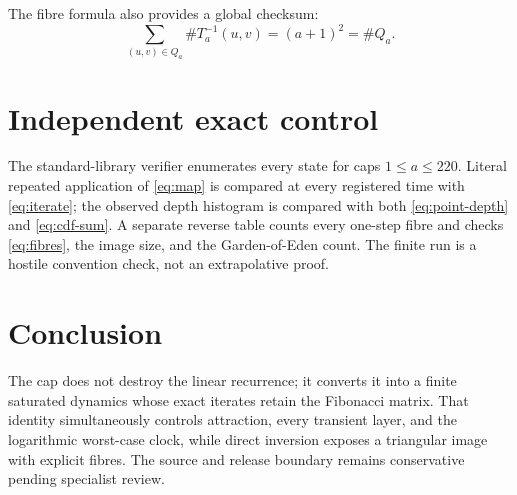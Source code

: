 \documentclass[11pt,a4paper]{amsart}
\begin{document}
The fibre formula also provides a global checksum:
\[
 \sum_{(u,v)\in Q_a}\#T_a^{-1}(u,v)=(a+1)^2=\#Q_a.
\]

\section{Independent exact control}

The standard-library verifier enumerates every state for caps $1\leq a\leq
220$.  Literal repeated application of \eqref{eq:map} is compared at every
registered time with \eqref{eq:iterate}; the observed depth histogram is
compared with both \eqref{eq:point-depth} and \eqref{eq:cdf-sum}.  A separate
reverse table counts every one-step fibre and checks \eqref{eq:fibres}, the
image size, and the Garden-of-Eden count.  The finite run is a hostile
convention check, not an extrapolative proof.

\section{Conclusion}

The cap does not destroy the linear recurrence; it converts it into a
finite saturated dynamics whose exact iterates retain the Fibonacci matrix.
That identity simultaneously controls attraction, every transient layer,
and the logarithmic worst-case clock, while direct inversion exposes a
triangular image with explicit fibres.  The source and release boundary
remains conservative pending specialist review.



\end{document}
